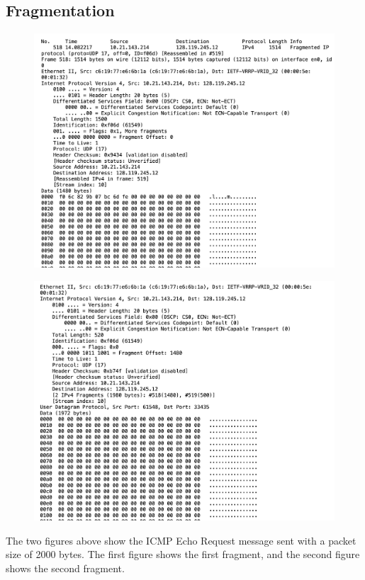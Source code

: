 \documentclass{article}
\begin{document}
\begin{CJK*}{UTF8}{gbsn}
\section{Fragmentation}
\begin{figure}[H]
    \centering
    \includegraphics[width=1.0\textwidth]{10-1.png}
\end{figure}
\begin{figure}[H]
    \centering
    \includegraphics[width=1.0\textwidth]{10-2.png}
\end{figure}
The two figures above show the ICMP Echo Request message sent with a packet size of 2000 bytes. The first figure shows the first fragment, and the second figure shows the second fragment.

\end{CJK*}
\end{document}

